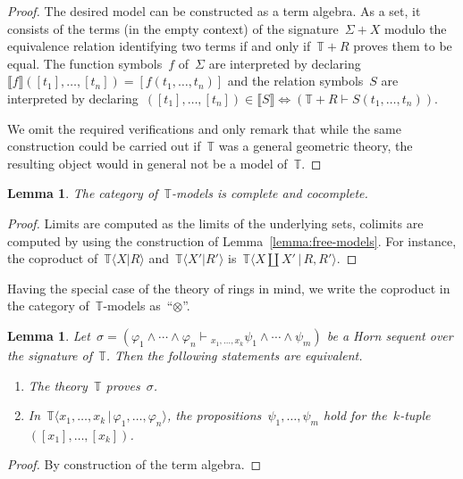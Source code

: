 \documentclass[oneside,reqno]{amsart}
\theoremstyle{definition}
\theoremstyle{plain}
\newtheorem{lemma}[defn]{Lemma}
\theoremstyle{remark}
\newcommand{\TT}{\mathbb{T}}
\renewcommand{\_}{\mathpunct{.}\,}
\newcommand{\?}{\,{:}\,}
\newcommand{\brak}[1]{\llbracket #1 \rrbracket}
\newcommand{\seq}[1]{\mathrel{\vdash\!\!\!_{#1}}}
\begin{document}
\begin{proof}The desired model can be constructed as a term algebra. As a set,
it consists of the terms (in the empty context) of the signature~$\Sigma + X$
modulo the equivalence relation identifying two terms if and only if~$\TT + R$
proves them to be equal. The function symbols~$f$ of~$\Sigma$ are interpreted
by declaring~$\brak{f}([t_1],\ldots,[t_n]) = [f(t_1,\ldots,t_n)]$ and the
relation symbols~$S$ are interpreted by declaring~$([t_1],\ldots,[t_n]) \in
\brak{S} \Leftrightarrow (\TT + R \vdash S(t_1,\ldots,t_n))$.

We omit the required verifications and only remark that while the same
construction could be carried out if~$\TT$ was a general geometric theory, the
resulting object would in general not be a model of~$\TT$.
\end{proof}

\begin{lemma}The category of~$\TT$-models is complete and
cocomplete.\end{lemma}

\begin{proof}Limits are computed as the limits of the underlying sets, colimits
are computed by using the construction of Lemma~\ref{lemma:free-models}. For
instance, the coproduct of~$\TT\langle X | R \rangle$ and~$\TT\langle X' | R'
\rangle$ is~$\TT\langle X \amalg X' \,|\, R, R' \rangle$.\end{proof}

Having the special case of the theory of rings in mind, we write the coproduct
in the category of~$\TT$-models as~``$\otimes$''.

\begin{lemma}Let~$\sigma = (\varphi_1 \wedge \cdots \wedge \varphi_n
\seq{x_1,\ldots,x_k} \psi_1 \wedge \cdots \wedge \psi_m)$ be a Horn sequent
over the signature of~$\TT$. Then the following statements are equivalent.
\begin{enumerate}
\item The theory~$\TT$ proves~$\sigma$.
\item In~$\TT\langle x_1,\ldots,x_k \,|\, \varphi_1,\ldots,\varphi_n \rangle$, the
propositions~$\psi_1,\ldots,\psi_m$ hold for
the~$k$-tuple~$([x_1],\ldots,[x_k])$.
\end{enumerate}
\end{lemma}

\begin{proof}By construction of the term algebra.\end{proof}
\end{document}
